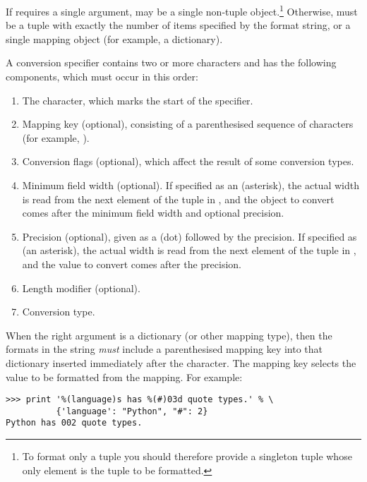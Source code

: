 If  requires a single argument,  may be a
single non-tuple object.\footnote{To format only a tuple you
should therefore provide a singleton tuple whose only element
is the tuple to be formatted.}  Otherwise,  must be a tuple with
exactly the number of items specified by the format string, or a
single mapping object (for example, a dictionary).

A conversion specifier contains two or more characters and has the
following components, which must occur in this order:

\begin{enumerate}
  \item  The \character{\%} character, which marks the start of the
         specifier.
  \item  Mapping key (optional), consisting of a parenthesised sequence
         of characters (for example, ).
  \item  Conversion flags (optional), which affect the result of some
         conversion types.
  \item  Minimum field width (optional).  If specified as an
         \character{*} (asterisk), the actual width is read from the
         next element of the tuple in , and the object to
         convert comes after the minimum field width and optional
         precision.
  \item  Precision (optional), given as a  (dot) followed
         by the precision.  If specified as \character{*} (an
         asterisk), the actual width is read from the next element of
         the tuple in , and the value to convert comes after
         the precision.
  \item  Length modifier (optional).
  \item  Conversion type.
\end{enumerate}

When the right argument is a dictionary (or other mapping type), then
the formats in the string \emph{must} include a parenthesised mapping key into
that dictionary inserted immediately after the \character{\%}
character. The mapping key selects the value to be formatted from the
mapping.  For example:

\begin{verbatim}
>>> print '%(language)s has %(#)03d quote types.' % \
          {'language': "Python", "#": 2}
Python has 002 quote types.
\end{verbatim}

